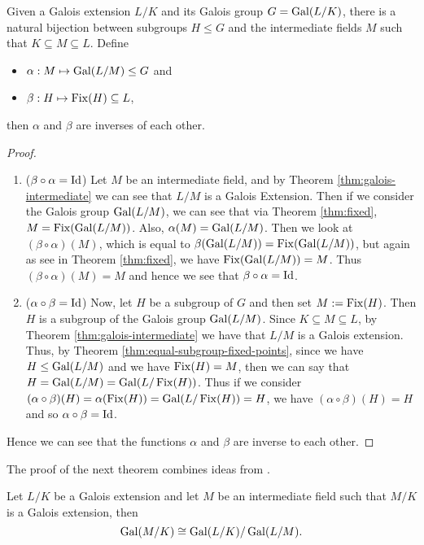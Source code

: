 \begin{theorem} \label{thm:fundamental-theorem} Given a Galois extension $L/K$ and its Galois group $G = \operatorname{Gal}(L/K)$, there is a natural bijection between subgroups $H\leq G$ and the intermediate fields $M$ such that $K \subseteq M \subseteq L$. Define

\begin{itemize}
    \item $\alpha:M \mapsto \operatorname{Gal}(L/M) \leq G$ and
    \item $\beta:H \mapsto \operatorname{Fix}(H) \subseteq L$,
\end{itemize}
then $\alpha$ and $\beta$ are inverses of each other.
\end{theorem}
\begin{proof}
\begin{enumerate}[label=(\roman*)]

 \item ($\beta \circ \alpha = \operatorname{Id}$) Let $M$ be an intermediate field, and by Theorem \ref{thm:galois-intermediate} we can see that $L/M$ is a Galois Extension. Then if we consider the Galois group $\operatorname{Gal}(L/M)$, we can see that via Theorem \ref{thm:fixed}, $M = \operatorname{Fix}(\operatorname{Gal}(L/M))$. Also, $\alpha(M) = \operatorname{Gal}(L/M)$. Then we look at $(\beta \circ \alpha)(M)$, which is equal to $\beta(\operatorname{Gal}(L/M)) = \operatorname{Fix}(\operatorname{Gal}(L/M))$, but again as see in Theorem \ref{thm:fixed}, we have $\operatorname{Fix}(\operatorname{Gal}(L/M)) = M$. Thus $(\beta \circ \alpha)(M) = M$ and hence we see that $\beta \circ \alpha = \operatorname{Id}$.

 \item ($\alpha \circ \beta = \operatorname{Id}$) Now, let $H$ be a subgroup of $G$ and then set $M :=\operatorname{Fix}(H)$. Then $H$ is a subgroup of the Galois group $\operatorname{Gal}(L/M)$. Since $K \subseteq M \subseteq L$, by Theorem \ref{thm:galois-intermediate} we have that $L/M$ is a Galois extension. Thus, by Theorem \ref{thm:equal-subgroup-fixed-points}, since we have $H\leq \operatorname{Gal}(L/M)$ and we have $\operatorname{Fix}(H)=M$, then we can say that $H=\operatorname{Gal}(L/M)=\operatorname{Gal}(L/\operatorname{Fix}(H))$. Thus if we consider $(\alpha \circ \beta)(H) = \alpha(\operatorname{Fix}(H)) = \operatorname{Gal}(L/\operatorname{Fix}(H))= H $, we have $(\alpha \circ \beta)(H) = H$ and so $\alpha \circ \beta = \operatorname{Id}$.
\end{enumerate}
Hence we can see that the functions $\alpha$ and $\beta$ are inverse to each other.
\end{proof}


The proof of the next theorem combines ideas from \cite{Stewart, rotman_galois_1998}. 
\begin{theorem} \label{thm:correspondence-quotient}
    Let $L / K$ be a Galois extension and let $M$ be an intermediate field such that $M /K$ is a Galois extension, then 
    $$\operatorname{Gal}(M / K) \cong \operatorname{Gal}(L / K) / \operatorname{Gal}(L / M). $$
\end{theorem}

